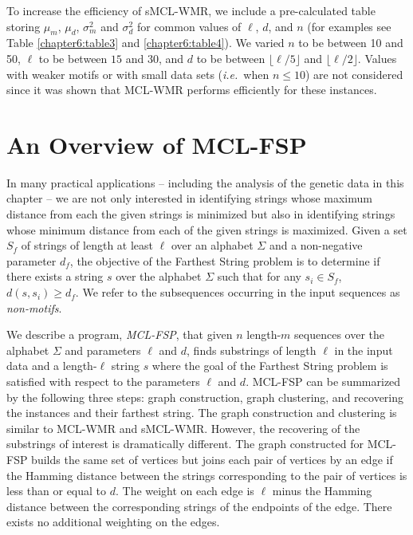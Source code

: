 To increase the efficiency of sMCL-WMR, we include a pre-calculated table storing $\mu_m$, $\mu_d$, $\sigma_m^2$ and $\sigma_d^2$ for common values of $\ell$, $d$, and $n$ (for examples see Table \ref{chapter6:table3} and \ref{chapter6:table4}).  We varied $n$ to be between 10 and 50, $\ell$ to be between $15$ and $30$, and $d$ to be between $\lfloor \ell/5\rfloor$ and $\lfloor \ell/2\rfloor$.  Values with weaker motifs or with small data sets ({\em i.e.}\ when $n \leq 10$) are not considered since it was shown that MCL-WMR performs efficiently for these instances. 


\section{An Overview of MCL-FSP}

In many practical applications -- including the analysis of the genetic data in this chapter -- we are not only interested in identifying strings whose maximum distance from each the given strings is minimized but also in identifying strings whose minimum distance from each of the given strings is maximized.  Given a set $S_f$ of strings of length at least $\ell$ over an alphabet $\Sigma$ and a non-negative parameter $d_f$,  the objective of the {\sc Farthest String} problem is to determine if there exists a string $s$ over the alphabet $\Sigma$  such that for any $s_i \in S_f$, $d(s, s_i) \geq d_f$.   We refer to the subsequences occurring in the input sequences as {\em non-motifs}.

We describe a program, {\em MCL-FSP}, that given $n$ length-$m$ sequences over the alphabet $\Sigma$ and parameters $\ell$ and $d$, finds substrings of length $\ell$ in the input data and a length-$\ell$ string $s$ where the goal of the {\sc Farthest String} problem is satisfied with respect to the parameters $\ell$ and $d$.  MCL-FSP can be summarized by the following three steps: graph construction, graph clustering, and recovering the instances and their farthest string.  The graph construction and clustering is similar to MCL-WMR and sMCL-WMR. However, the recovering of the substrings of interest is dramatically different.  The graph constructed for MCL-FSP builds the same set of vertices but joins each pair of vertices by an edge if the Hamming distance between the strings corresponding to the pair of vertices is less than or equal to $d$.  The weight on each edge is $\ell$ minus the Hamming distance between the corresponding strings of the endpoints of the edge.  There exists no additional weighting on the edges. 

